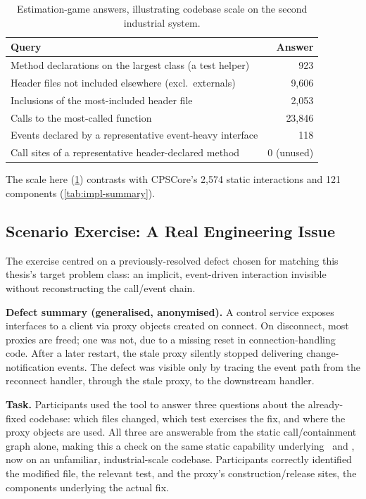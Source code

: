 \begin{table}[htb]
\centering
\caption{Estimation-game answers, illustrating codebase scale on the
  second industrial system.}
\label{tab:renaissance-scale}
\begin{tabular}{@{} l r @{}}
\toprule
\textbf{Query} & \textbf{Answer} \\
\midrule
Method declarations on the largest class (a test helper) & 923 \\
Header files not included elsewhere (excl.\ externals)   & 9,606 \\
Inclusions of the most-included header file              & 2,053 \\
Calls to the most-called function                         & 23,846 \\
Events declared by a representative event-heavy interface & 118 \\
Call sites of a representative header-declared method      & 0 (unused) \\
\bottomrule
\end{tabular}
\end{table}

The scale here (\cref{tab:renaissance-scale}) contrasts with CPSCore's
2,574 static interactions and 121 components (\cref{tab:impl-summary}).

\subsection{Scenario Exercise: A Real Engineering Issue}\label{sec:scenario-exercise}

The exercise centred on a previously-resolved defect chosen for matching
this thesis's target problem class: an implicit, event-driven
interaction invisible without reconstructing the call/event chain.

\textbf{Defect summary (generalised, anonymised).} A control service
exposes interfaces to a client via proxy objects created on connect. On
disconnect, most proxies are freed; one was not, due to a missing reset
in connection-handling code. After a later restart, the stale proxy
silently stopped delivering change-notification events. The defect was
visible only by tracing the event path from the reconnect handler,
through the stale proxy, to the downstream handler.

\textbf{Task.} Participants used the tool to answer three questions
about the already-fixed codebase: which files changed, which test
exercises the fix, and where the proxy objects are used. All three are
answerable from the static call/containment graph alone, making this a
check on the same static capability underlying \rqone\ and \rqtwo, now
on an unfamiliar, industrial-scale codebase. Participants correctly
identified the modified file, the relevant test, and the proxy's
construction/release sites, the components underlying the actual fix.

